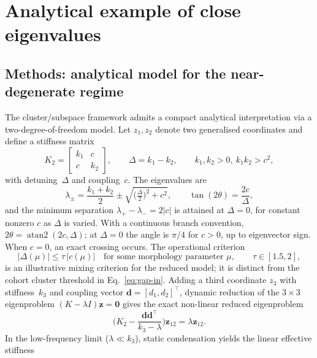 \documentclass[pdflatex,sn-basic]{sn-jnl}
\begin{document}
\section{Analytical example of close eigenvalues}\label{app:toy}
\subsection{Methods: analytical model for the near-degenerate regime}
\label{sec:toy-methods}

The cluster/subspace framework admits a compact analytical interpretation via a two-degree-of-freedom model.
Let $z_1,z_2$ denote two generalised coordinates and define a stiffness matrix
\begin{equation}
K_2=\begin{bmatrix} k_1 & c\\ c & k_2\end{bmatrix},\qquad \Delta=k_1-k_2,\qquad k_1,k_2>0,\ k_1k_2>c^2,
\end{equation}
with detuning~$\Delta$ and coupling~$c$.
The eigenvalues are
\begin{equation}
\lambda_{\pm}=\frac{k_1+k_2}{2}\pm\sqrt{\Big(\tfrac{\Delta}{2}\Big)^2+c^2},
\qquad
\tan(2\theta)=\frac{2c}{\Delta},
\label{eq:2dof-eig}
\end{equation}
and the minimum separation $\lambda_+-\lambda_-=2|c|$ is attained at $\Delta=0$, for constant nonzero $c$ as $\Delta$ is varied. With a continuous branch convention, $2\theta=\operatorname{atan2}(2c,\Delta)$; at $\Delta=0$ the angle is $\pi/4$ for $c>0$, up to eigenvector sign. When $c=0$, an exact crossing occurs.
The operational criterion
\begin{equation}
|\Delta(\mu)|\le\tau\,|c(\mu)|\quad\text{for some morphology parameter }\mu,\qquad \tau\in[1.5,2],
\label{eq:2dof-criterion}
\end{equation}
is an illustrative mixing criterion for the reduced model; it is distinct from the cohort cluster threshold in Eq.~\eqref{eq:gap-in}.
Adding a third coordinate $z_3$ with stiffness~$k_3$ and coupling vector $\mathbf d = [d_1, d_2]^\top$, dynamic reduction of the $3\times 3$ eigenproblem $(K - \lambda I)\mathbf z = \mathbf 0$ gives the exact non-linear reduced eigenproblem
\begin{equation}
\Big( K_2 - \frac{\mathbf d \mathbf d^\top}{k_3 - \lambda} \Big) \mathbf z_{12} = \lambda \mathbf z_{12}.
\label{eq:dynamic-schur}
\end{equation}
In the low-frequency limit ($\lambda \ll k_3$), static condensation yields the linear effective stiffness
\end{document}
